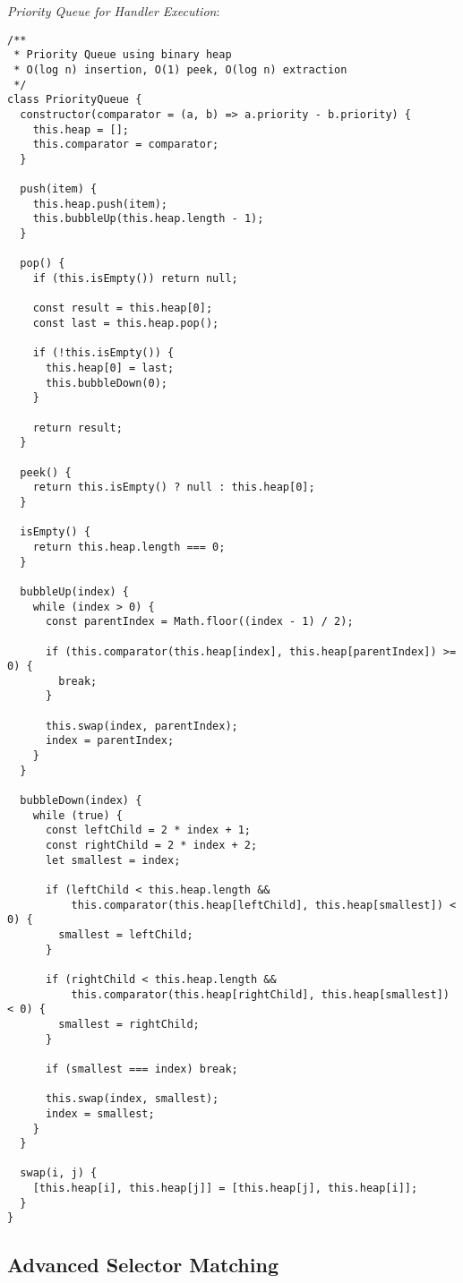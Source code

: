 \documentclass[11pt]{article}
\begin{document}
\emph{Priority Queue for Handler Execution}:

\begin{verbatim}
/**
 * Priority Queue using binary heap
 * O(log n) insertion, O(1) peek, O(log n) extraction
 */
class PriorityQueue {
  constructor(comparator = (a, b) => a.priority - b.priority) {
    this.heap = [];
    this.comparator = comparator;
  }
  
  push(item) {
    this.heap.push(item);
    this.bubbleUp(this.heap.length - 1);
  }
  
  pop() {
    if (this.isEmpty()) return null;
    
    const result = this.heap[0];
    const last = this.heap.pop();
    
    if (!this.isEmpty()) {
      this.heap[0] = last;
      this.bubbleDown(0);
    }
    
    return result;
  }
  
  peek() {
    return this.isEmpty() ? null : this.heap[0];
  }
  
  isEmpty() {
    return this.heap.length === 0;
  }
  
  bubbleUp(index) {
    while (index > 0) {
      const parentIndex = Math.floor((index - 1) / 2);
      
      if (this.comparator(this.heap[index], this.heap[parentIndex]) >= 0) {
        break;
      }
      
      this.swap(index, parentIndex);
      index = parentIndex;
    }
  }
  
  bubbleDown(index) {
    while (true) {
      const leftChild = 2 * index + 1;
      const rightChild = 2 * index + 2;
      let smallest = index;
      
      if (leftChild < this.heap.length && 
          this.comparator(this.heap[leftChild], this.heap[smallest]) < 0) {
        smallest = leftChild;
      }
      
      if (rightChild < this.heap.length && 
          this.comparator(this.heap[rightChild], this.heap[smallest]) < 0) {
        smallest = rightChild;
      }
      
      if (smallest === index) break;
      
      this.swap(index, smallest);
      index = smallest;
    }
  }
  
  swap(i, j) {
    [this.heap[i], this.heap[j]] = [this.heap[j], this.heap[i]];
  }
}
\end{verbatim}
\subsection{Advanced Selector Matching}
\label{sec:org8bb9c4b}
\end{document}

